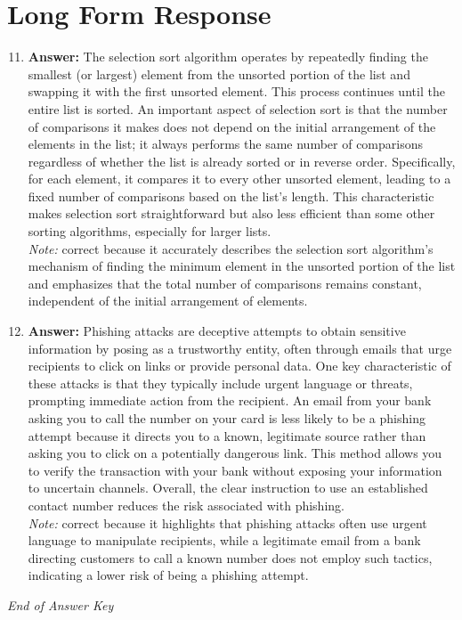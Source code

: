 \documentclass[12pt]{article}
\begin{document}
\section*{Long Form Response}
\begin{enumerate}[label=\arabic*.]
\setcounter{enumi}{10}
\item \textbf{Answer:} The selection sort algorithm operates by repeatedly finding the smallest (or largest) element from the unsorted portion of the list and swapping it with the first unsorted element. This process continues until the entire list is sorted. An important aspect of selection sort is that the number of comparisons it makes does not depend on the initial arrangement of the elements in the list; it always performs the same number of comparisons regardless of whether the list is already sorted or in reverse order. Specifically, for each element, it compares it to every other unsorted element, leading to a fixed number of comparisons based on the list's length. This characteristic makes selection sort straightforward but also less efficient than some other sorting algorithms, especially for larger lists.
\\ \textit{Note:} correct because it accurately describes the selection sort algorithm's mechanism of finding the minimum element in the unsorted portion of the list and emphasizes that the total number of comparisons remains constant, independent of the initial arrangement of elements.
\item \textbf{Answer:} Phishing attacks are deceptive attempts to obtain sensitive information by posing as a trustworthy entity, often through emails that urge recipients to click on links or provide personal data. One key characteristic of these attacks is that they typically include urgent language or threats, prompting immediate action from the recipient. An email from your bank asking you to call the number on your card is less likely to be a phishing attempt because it directs you to a known, legitimate source rather than asking you to click on a potentially dangerous link. This method allows you to verify the transaction with your bank without exposing your information to uncertain channels. Overall, the clear instruction to use an established contact number reduces the risk associated with phishing.
\\ \textit{Note:} correct because it highlights that phishing attacks often use urgent language to manipulate recipients, while a legitimate email from a bank directing customers to call a known number does not employ such tactics, indicating a lower risk of being a phishing attempt.
\end{enumerate}

\vfill
\noindent\textit{End of Answer Key}
\end{document}
